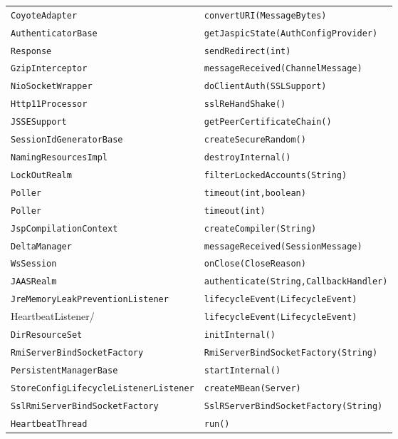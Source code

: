 \begin{center}
\begin{longtable}{ll}
\lstinline/CoyoteAdapter/&{\lstinline/convertURI(MessageBytes)/}\\
\lstinline/AuthenticatorBase/&{\lstinline/getJaspicState(AuthConfigProvider)/}\\
\lstinline/Response/&{\lstinline/sendRedirect(int)/}\\
\lstinline/GzipInterceptor/&{\lstinline/messageReceived(ChannelMessage)/}\\
\lstinline/NioSocketWrapper/&{\lstinline/doClientAuth(SSLSupport)/}\\
\lstinline/Http11Processor/&{\lstinline/sslReHandShake()/}\\
\lstinline/JSSESupport/&{\lstinline/getPeerCertificateChain()/}\\
\lstinline/SessionIdGeneratorBase/&{\lstinline/createSecureRandom()/}\\
\lstinline/NamingResourcesImpl/&{\lstinline/destroyInternal()/}\\
\lstinline/LockOutRealm/&{\lstinline/filterLockedAccounts(String)/}\\
\lstinline/Poller/&{\lstinline/timeout(int,boolean)/}\\
\lstinline/Poller/&{\lstinline/timeout(int)/}\\
\lstinline/JspCompilationContext/&{\lstinline/createCompiler(String)/}\\
\lstinline/DeltaManager/&{\lstinline/messageReceived(SessionMessage)/}\\
\lstinline/WsSession/&{\lstinline/onClose(CloseReason)/}\\
\lstinline/JAASRealm/&{\lstinline/authenticate(String,CallbackHandler)/}\\
\lstinline/JreMemoryLeakPreventionListener/&{\lstinline/lifecycleEvent(LifecycleEvent)/}\\
\lstinline//HeartbeatListener/&{\lstinline/lifecycleEvent(LifecycleEvent)/}\\
\lstinline/DirResourceSet/&{\lstinline/initInternal()/}\\
\lstinline/RmiServerBindSocketFactory/&{\lstinline/RmiServerBindSocketFactory(String)/}\\
\lstinline/PersistentManagerBase/&{\lstinline/startInternal()/}\\
\lstinline/StoreConfigLifecycleListenerListener/&{\lstinline/createMBean(Server)/}\\
\lstinline/SslRmiServerBindSocketFactory/&{\lstinline/SslRServerBindSocketFactory(String)/}\\
\lstinline/HeartbeatThread/&{\lstinline/run()/}\\

\end{longtable}
\end{center}
